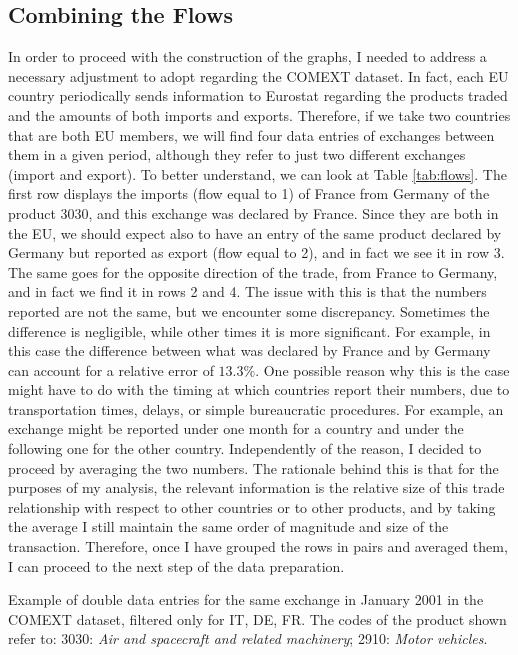 \subsection{Combining the Flows}
In order to proceed with the construction of the graphs, I needed to address a necessary adjustment to adopt regarding the COMEXT dataset. In fact, each EU country periodically sends information to Eurostat regarding the products traded and the amounts of both imports and exports. Therefore, if we take two countries that are both EU members, we will find four data entries of exchanges between them in a given period, although they refer to just two different exchanges (import and export). To better understand, we can look at Table \ref{tab:flows}. The first row displays the imports (flow equal to 1) of France from Germany of the product 3030, and this exchange was declared by France. Since they are both in the EU, we should expect also to have an entry of the same product declared by Germany but reported as export (flow equal to 2), and in fact we see it in row 3. The same goes for the opposite direction of the trade, from France to Germany, and in fact we find it in rows 2 and 4. The issue with this is that the numbers reported are not the same, but we encounter some discrepancy. Sometimes the difference is negligible, while other times it is more significant. For example, in this case the difference between what was declared by France and by Germany can account for a relative error of $13.3\%$. One possible reason why this is the case might have to do with the timing at which countries report their numbers, due to transportation times, delays, or simple bureaucratic procedures. For example, an exchange might be reported under one month for a country and under the following one for the other country.
Independently of the reason, I decided to proceed by averaging the two numbers. The rationale behind this is that for the purposes of my analysis, the relevant information is the relative size of this trade relationship with respect to other countries or to other products, and by taking the average I still maintain the same order of magnitude and size of the transaction.
Therefore, once I have grouped the rows in pairs and averaged them, I can proceed to the next step of the data preparation.

\begin{table}[h]
    \centering
    {\small
    
    }
    \caption[Example of double data entries for the same exchange in January 2001 in the COMEXT dataset, filtered only for IT, DE, FR.]{Example of double data entries for the same exchange in January 2001 in the COMEXT dataset, filtered only for IT, DE, FR. The codes of the product shown refer to: 3030: \textit{Air and spacecraft and related machinery}; 2910: \textit{Motor vehicles}.}
    \label{tab:flows}
\end{table}

